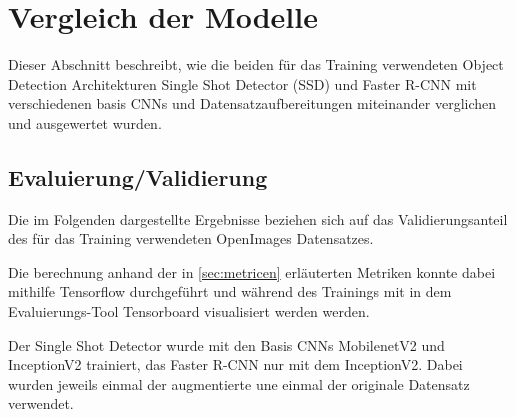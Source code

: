 \section{Vergleich der Modelle}\label{sec:model_vergleich}

Dieser Abschnitt beschreibt, wie die beiden für das Training 
verwendeten Object Detection Architekturen Single Shot Detector (SSD)
und Faster R-CNN mit verschiedenen basis
CNNs und Datensatzaufbereitungen miteinander verglichen und 
ausgewertet wurden.


\subsection{Evaluierung/Validierung}

Die im Folgenden dargestellte Ergebnisse beziehen sich auf 
das Validierungsanteil des für das Training verwendeten 
OpenImages Datensatzes.

Die berechnung anhand der in \ref{sec:metricen} erläuterten 
Metriken konnte dabei mithilfe Tensorflow durchgeführt 
und während des Trainings mit in dem Evaluierungs-Tool 
Tensorboard visualisiert werden werden.

Der Single Shot Detector wurde mit den Basis CNNs MobilenetV2 und
InceptionV2 trainiert, das Faster R-CNN nur mit dem InceptionV2.
Dabei wurden jeweils einmal der augmentierte une einmal 
der originale Datensatz verwendet.


